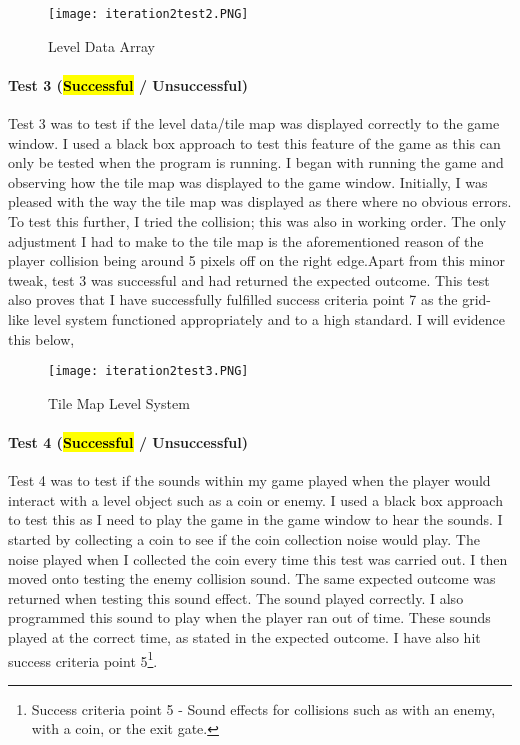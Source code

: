 \documentclass[12pt]{report}
\begin{document}
\begin{figure}[H]
    \centering
    \texttt{[image: iteration2test2.PNG]}
    \caption{Level Data Array}
\end{figure}

\paragraph{Test 3 (\hl{Successful} / Unsuccessful)}
Test 3 was to test if the level data/tile map was displayed correctly to the game window. I used a black box approach to test this feature of the game as this can only be tested when the program is running. I began with running the game and observing how the tile map was displayed to the game window. Initially, I was pleased with the way the tile map was displayed as there where no obvious errors. To test this further, I tried the collision; this was also in working order. The only adjustment I had to make to the tile map is the aforementioned reason of the player collision being around 5 pixels off on the right edge.Apart from this minor tweak, test 3 was successful and had returned the expected outcome. This test also proves that I have successfully fulfilled success criteria point 7 as the grid-like level system functioned appropriately and to a high standard. I will evidence this below,

\begin{figure}[H]
    \centering
    \texttt{[image: iteration2test3.PNG]}
    \caption{Tile Map Level System}
\end{figure}

\paragraph{Test 4 (\hl{Successful} / Unsuccessful)}
Test 4 was to test if the sounds within my game played when the player would interact with a level object such as a coin or enemy. I used a black box approach to test this as I need to play the game in the game window to hear the sounds. I started by collecting a coin to see if the coin collection noise would play. The noise played when I collected the coin every time this test was carried out. I then moved onto testing the enemy collision sound. The same expected outcome was returned when testing this sound effect. The sound played correctly. I also programmed this sound to play when the player ran out of time. These sounds played at the correct time, as stated in the expected outcome. I have also hit success criteria point 5\footnote{Success criteria point 5 - Sound effects for collisions such as with an enemy, with a coin, or the exit gate.}.
\end{document}
